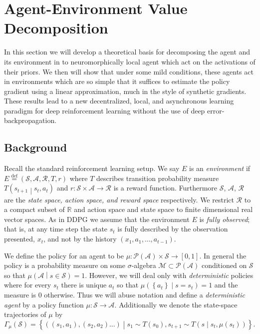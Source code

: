 \documentclass{article} %
\numberwithin{equation}{subsection}
\numberwithin{theorem}{subsection}
\newcommand{\set}[1]{ \left\{ #1 \right\} }
\def\suchthat{\mathrel{}\middle|\mathrel{}}
\def\defeq{\stackrel{\text{def}}{=}}
\theoremstyle{named}
\def\scriptm{{\mathcal M}}
\def\scripta{{\mathcal A}}
\def\scriptr{{\mathcal R}}
\def\scriptp{{\mathcal P}}
\def\scripts{{\mathcal S}}
\begin{document}

\section{Agent-Environment Value Decomposition}

In this section we will develop a theoretical basis for decomposing the agent and its environment in to neuromorphically local agent which act on the activations of their priors. We then will show that under some mild conditions, these agents act in environments which are so simple that it suffices to estimate the policy gradient using a linear approximation, much in the style of synthetic gradients. These results lead to a new decentralized, local, and asynchronous learning paradigm for deep reinforcement learning without the use of deep error-backpropagation.

\subsection{Background}
Recall the standard reinforcement learning setup. We say $E$ is an \emph{environment} if $E \defeq (\scripts, \scripta, \scriptr, T, r)$ where $T$ describes transition probability measure $T\left(s_{t+1}\suchthat s_t, a_t\right)$ and $r: \scripts \times \scripta \to \scriptr$ is a reward function. Furthermore $\scripts$, $\scripta$, $\scriptr$ are the \emph{state space, action space, and reward space} respectively. We restrict $\scriptr$ to a compact subset of $\mathbb{R}$ and action space and state space to finite dimensional real vector spaces. As in DDPG we assume that the environment $E$ is \emph{fully observed}; that is, at any time step the state $s_t$ is fully described by the observation presented, $x_t$, and not by the history $(x_1, a_1, \dots, a_{t-1}).$

We define the policy for an agent to be $\mu: \scriptp(\scripta) \times \scripts \to [0,1]$. In general the policy is a probability measure on some $\sigma$-algebra $\scriptm \subset \scriptp(\scripta)$ conditioned on $\scripts$ so that $\mu\left(\scripta \suchthat s \in \scripts\right) = 1$. However, we will deal only with \emph{deterministic} policies where for every $s_t$ there is unique $a_t$ so that $\mu\left(\set{a_t} \suchthat s = s_t\right) = 1$ and the measure is $0$ otherwise. Thus we will abuse notation and define a \emph{deterministic agent} by a policy function $\mu: \scripts \to \scripta$. Additionally we denote the state-space trajectories of $\mu $ by
\begin{equation}
 	\Gamma_\mu(\scripts) = \set{((s_1, a_1), (s_2, a_2) \dots)\suchthat s_1 \sim T(s_0), s_{t+1} \sim T\left(s \suchthat s_t, \mu(s_t)\right)}.
 \end{equation}
\end{document}
